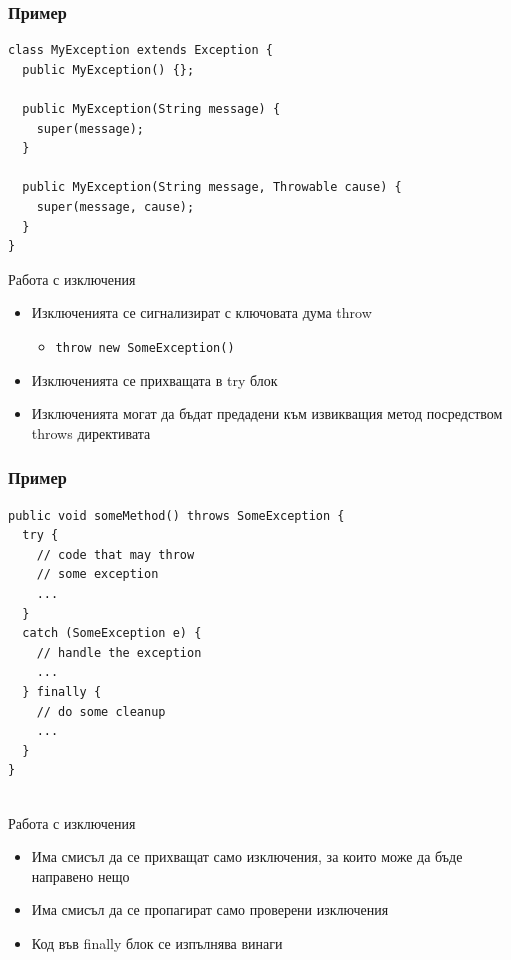 \documentclass{beamer}
\begin{document}
\begin{frame}[fragile]
  \frametitle{Пример}
  \transdissolve
\begin{lstlisting}
class MyException extends Exception {
  public MyException() {};

  public MyException(String message) {
    super(message);    
  }
  
  public MyException(String message, Throwable cause) {
    super(message, cause);  
  }
}    
\end{lstlisting}
\end{frame}

\begin{frame}{Работа с изключения}
  \transdissolve
  \begin{itemize}
  \item Изключенията се сигнализират с ключовата дума throw
    \begin{itemize}
      \item \lstinline$throw new SomeException()$
    \end{itemize}
  \item Изключенията се прихващата в try блок
  \item Изключенията могат да бъдат предадени към извикващия метод
    посредством throws директивата
  \end{itemize}
\end{frame}

\begin{frame}[fragile]
  \frametitle{Пример}
  \transdissolve
\begin{lstlisting}
public void someMethod() throws SomeException {
  try {
    // code that may throw
    // some exception
    ... 
  }
  catch (SomeException e) {
    // handle the exception
    ...
  } finally {
    // do some cleanup
    ...
  }
}
  
\end{lstlisting}
\end{frame}

\begin{frame}{Работа с изключения}
  \transdissolve
  \begin{itemize}
  \item Има смисъл да се прихващат само изключения, за които може да
    бъде направено нещо
  \item Има смисъл да се пропагират само проверени изключения
  \item Код във finally блок се изпълнява винаги 
  \end{itemize}
\end{frame}
\end{document}
